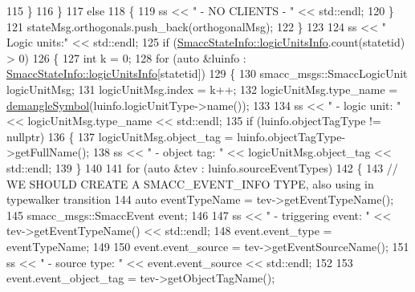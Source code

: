 \begin{DoxyCode}
115                 \}
116             \}
117             \textcolor{keywordflow}{else}
118             \{
119                 ss << \textcolor{stringliteral}{"          - NO CLIENTS - "} << std::endl;
120             \}
121             stateMsg.orthogonals.push\_back(orthogonalMsg);
122         \}
123 
124         ss << \textcolor{stringliteral}{" Logic units:"} << std::endl;
125         \textcolor{keywordflow}{if} (\hyperlink{classsmacc_1_1introspection_1_1SmaccStateInfo_a7a22f3c1ea22042a19f897db4ecfeb67}{SmaccStateInfo::logicUnitsInfo}.count(statetid) > 0)
126         \{
127             \textcolor{keywordtype}{int} k = 0;
128             \textcolor{keywordflow}{for} (\textcolor{keyword}{auto} &luinfo : \hyperlink{classsmacc_1_1introspection_1_1SmaccStateInfo_a7a22f3c1ea22042a19f897db4ecfeb67}{SmaccStateInfo::logicUnitsInfo}[statetid])
129             \{
130                 smacc\_msgs::SmaccLogicUnit logicUnitMsg;
131                 logicUnitMsg.index = k++;
132                 logicUnitMsg.type\_name = \hyperlink{namespacesmacc_1_1introspection_a2f495108db3e57604d8d3ff5ef030302}{demangleSymbol}(luinfo.logicUnitType->name());
133 
134                 ss << \textcolor{stringliteral}{" - logic unit: "} << logicUnitMsg.type\_name << std::endl;
135                 \textcolor{keywordflow}{if} (luinfo.objectTagType != \textcolor{keyword}{nullptr})
136                 \{
137                     logicUnitMsg.object\_tag = luinfo.objectTagType->getFullName();
138                     ss << \textcolor{stringliteral}{"        - object tag: "} << logicUnitMsg.object\_tag << std::endl;
139                 \}
140 
141                 \textcolor{keywordflow}{for} (\textcolor{keyword}{auto} &tev : luinfo.sourceEventTypes)
142                 \{
143                     \textcolor{comment}{// WE SHOULD CREATE A SMACC\_EVENT\_INFO TYPE, also using in typewalker transition}
144                     \textcolor{keyword}{auto} eventTypeName = tev->getEventTypeName();
145                     smacc\_msgs::SmaccEvent event;
146 
147                     ss << \textcolor{stringliteral}{"             - triggering event: "} << tev->getEventTypeName() << std::endl;
148                     \textcolor{keyword}{event}.event\_type = eventTypeName;
149 
150                     \textcolor{keyword}{event}.event\_source = tev->getEventSourceName();
151                     ss << \textcolor{stringliteral}{"                 - source type: "} << \textcolor{keyword}{event}.event\_source << std::endl;
152 
153                     \textcolor{keyword}{event}.event\_object\_tag = tev->getObjectTagName();

\end{DoxyCode}
